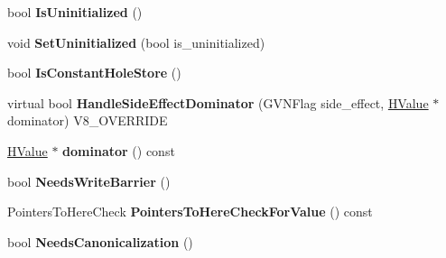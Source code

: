 \begin{DoxyCompactItemize}
\item 
\hypertarget{classv8_1_1internal_1_1_v8___f_i_n_a_l_a37c6f100560570f47e4e173744b7ed1e}{}bool {\bfseries Is\+Uninitialized} ()\label{classv8_1_1internal_1_1_v8___f_i_n_a_l_a37c6f100560570f47e4e173744b7ed1e}

\item 
\hypertarget{classv8_1_1internal_1_1_v8___f_i_n_a_l_a1ccb0edc8e8bf83e9c46458a18740597}{}void {\bfseries Set\+Uninitialized} (bool is\+\_\+uninitialized)\label{classv8_1_1internal_1_1_v8___f_i_n_a_l_a1ccb0edc8e8bf83e9c46458a18740597}

\item 
\hypertarget{classv8_1_1internal_1_1_v8___f_i_n_a_l_ad316686a550c152db692fcf9fee2e659}{}bool {\bfseries Is\+Constant\+Hole\+Store} ()\label{classv8_1_1internal_1_1_v8___f_i_n_a_l_ad316686a550c152db692fcf9fee2e659}

\item 
\hypertarget{classv8_1_1internal_1_1_v8___f_i_n_a_l_a05c41b70d08a5a1706e2c0520deebb01}{}virtual bool {\bfseries Handle\+Side\+Effect\+Dominator} (G\+V\+N\+Flag side\+\_\+effect, \hyperlink{classv8_1_1internal_1_1_h_value}{H\+Value} $\ast$dominator) V8\+\_\+\+O\+V\+E\+R\+R\+I\+D\+E\label{classv8_1_1internal_1_1_v8___f_i_n_a_l_a05c41b70d08a5a1706e2c0520deebb01}

\item 
\hypertarget{classv8_1_1internal_1_1_v8___f_i_n_a_l_a0770c13d5d2d630501a260cac0e892be}{}\hyperlink{classv8_1_1internal_1_1_h_value}{H\+Value} $\ast$ {\bfseries dominator} () const \label{classv8_1_1internal_1_1_v8___f_i_n_a_l_a0770c13d5d2d630501a260cac0e892be}

\item 
\hypertarget{classv8_1_1internal_1_1_v8___f_i_n_a_l_a385305b19f0305f3135782f27e02646a}{}bool {\bfseries Needs\+Write\+Barrier} ()\label{classv8_1_1internal_1_1_v8___f_i_n_a_l_a385305b19f0305f3135782f27e02646a}

\item 
\hypertarget{classv8_1_1internal_1_1_v8___f_i_n_a_l_ad4aa241f78cf3c3f27f390b10f7bdcd2}{}Pointers\+To\+Here\+Check {\bfseries Pointers\+To\+Here\+Check\+For\+Value} () const \label{classv8_1_1internal_1_1_v8___f_i_n_a_l_ad4aa241f78cf3c3f27f390b10f7bdcd2}

\item 
\hypertarget{classv8_1_1internal_1_1_v8___f_i_n_a_l_abfe477f32eeaa2ac2e630a7d655dadcb}{}bool {\bfseries Needs\+Canonicalization} ()\label{classv8_1_1internal_1_1_v8___f_i_n_a_l_abfe477f32eeaa2ac2e630a7d655dadcb}


\end{DoxyCompactItemize}
